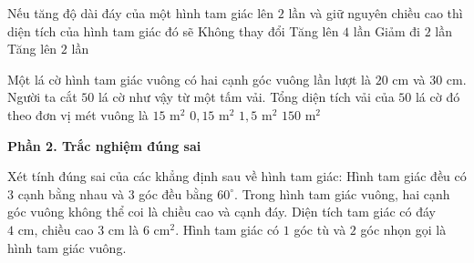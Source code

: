 \begin{ex} %
Nếu tăng độ dài đáy của một hình tam giác lên $2$ lần và giữ nguyên chiều cao thì diện tích của hình tam giác đó sẽ
\choice
{Không thay đổi}
{Tăng lên $4$ lần}
{Giảm đi $2$ lần}
{\True Tăng lên $2$ lần}
\end{ex}

\begin{ex} %
Một lá cờ hình tam giác vuông có hai cạnh góc vuông lần lượt là $20\text{ cm}$ và $30\text{ cm}$. Người ta cắt $50$ lá cờ như vậy từ một tấm vải. Tổng diện tích vải của $50$ lá cờ đó theo đơn vị mét vuông là
\choice
{$15\text{ m}^2$}
{$0{,}15\text{ m}^2$}
{\True $1{,}5\text{ m}^2$}
{$150\text{ m}^2$}
\end{ex}

\textbf{Phần 2. Trắc nghiệm đúng sai}

\begin{ex} %
Xét tính đúng sai của các khẳng định sau về hình tam giác:
\choiceTF
{\True Hình tam giác đều có $3$ cạnh bằng nhau và $3$ góc đều bằng $60^\circ$.}
{Trong hình tam giác vuông, hai cạnh góc vuông không thể coi là chiều cao và cạnh đáy.}
{\True Diện tích tam giác có đáy $4\text{ cm}$, chiều cao $3\text{ cm}$ là $6\text{ cm}^2$.}
{Hình tam giác có $1$ góc tù và $2$ góc nhọn gọi là hình tam giác vuông.}
\end{ex}

